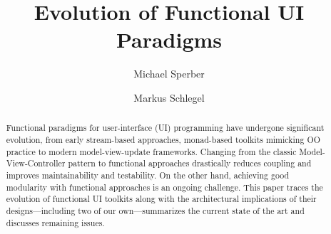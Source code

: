 \documentclass[sigplan,screen]{acmart}
\begin{document}
\title{Evolution of Functional UI Paradigms}

\author{Michael Sperber}

\author{Markus Schlegel}

\begin{abstract}
  Functional paradigms for user-interface (UI) programming have
  undergone significant evolution, from early
  stream-based approaches, monad-based toolkits mimicking OO practice
  to modern model-view-update frameworks.  Changing from the
  classic Model-View-Controller pattern to
  functional approaches 
  drastically reduces coupling and improves maintainability and
  testability.  On the other hand, achieving good modularity with
  functional approaches is an ongoing challenge.  This paper traces
  the evolution of functional UI toolkits along with the architectural
  implications of their designs---including two of our own---summarizes
  the current state of the art and discusses remaining issues.
\end{abstract}
\end{document}
